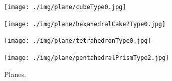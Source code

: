 \documentclass[suppldata, dvipdfmx]{interact}
\theoremstyle{plain}%
\theoremstyle{definition}
\theoremstyle{remark}
\theoremstyle{problemstyle}
\begin{document}
\begin{figure}[h!tbp]
  \begin{minipage}[t]{0.23\textwidth}
   \centering
   \texttt{[image: ./img/plane/cubeType0.jpg]}
   \label{fig:planeCube}
  \end{minipage}
  \hspace*{\fill}
  \begin{minipage}[t]{0.23\textwidth}
   \centering
   \texttt{[image: ./img/plane/hexahedralCake2Type0.jpg]}
   \label{fig:planeCake}
  \end{minipage}
 \hspace*{\fill}
  \begin{minipage}[t]{0.23\textwidth}
   \centering
   \texttt{[image: ./img/plane/tetrahedronType0.jpg]}
   \label{fig:planeTetra}
  \end{minipage}
 \hspace*{\fill}
  \begin{minipage}[t]{0.23\textwidth}
   \centering
   \texttt{[image: ./img/plane/pentahedralPrismType2.jpg]}
   \label{fig:planePentaPrism}
  \end{minipage}
 \caption{Planes.}
 \label{fig:planes}
 \hspace*{\fill}
\end{figure}
\end{document}
